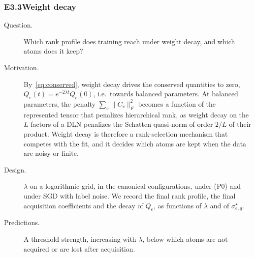 \documentclass[11pt]{article}
\newcommand{\norm}[1]{\lVert #1\rVert}
\theoremstyle{definition}
\numberwithin{equation}{section}
\begin{document}
\subsubsection*{E3.3\quad Weight decay}
\begin{description}
\item[Question.] Which rank profile does training reach under weight decay, and which atoms does it keep?
\item[Motivation.] By~\eqref{eq:conserved}, weight decay drives the conserved quantities to zero, $Q_e(t)=e^{-2\lambda t}Q_e(0)$, i.e.\ towards balanced parameters. At balanced parameters, the penalty $\sum_v\norm{C_v}_F^2$ becomes a function of the represented tensor that penalizes hierarchical rank, as weight decay on the $L$ factors of a DLN penalizes the Schatten quasi-norm of order $2/L$ of their product. Weight decay is therefore a rank-selection mechanism that competes with the fit, and it decides which atoms are kept when the data are noisy or finite.
\item[Design.] $\lambda$ on a logarithmic grid, in the canonical configurations, under (P0) and under SGD with label noise. We record the final rank profile, the final acquisition coefficients and the decay of $Q_e$, as functions of $\lambda$ and of $\sigma^\star_{e,q}$.
\item[Predictions.] A threshold strength, increasing with $\lambda$, below which atoms are not acquired or are lost after acquisition.
\end{description}
\end{document}
